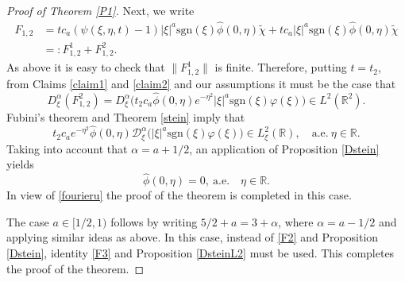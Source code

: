 \documentclass[reqno]{amsart}
\newcommand{\ha}{\hat{\phi}}
\newcommand{\R}{\mathbb R}
\newcommand{\sgn}{\text{sgn}}
\numberwithin{equation}{section}
\begin{document}
\begin{proof}[Proof of Theorem \ref{P1}]
Next, we write
\begin{equation}\label{desB5}
\begin{split}
F_{1,2}
&= tc_a (\psi(\xi,\eta,t) -1) |\xi|^{a}\sgn(\xi)\ha(0,\eta) \tilde{\chi}+tc_a|\xi|^a \sgn(\xi)\ha(0,\eta)\tilde{\chi}\\
&=: F_{1,2}^{1}+F_{1,2}^{2}.
\end{split}
\end{equation}
As above it is easy to check that  $\|F_{1,2}^{1}\|$ is finite. Therefore, putting $t=t_2$, from Claims \ref{claim1} and \ref{claim2} and our assumptions it must be the case that 
\begin{equation*}
 D^{\alpha}_{\xi}(F_{1,2}^{2})=D^{\alpha}_{\xi}\big( t_2 c_a \ha (0,\eta)e^{-\eta^2}|\xi|^a \sgn(\xi)\varphi(\xi)\big) \in L^2(\R^2).
\end{equation*}
Fubini's theorem and Theorem \ref{stein} imply that
\begin{equation}\label{teoP1e}
t_2 c_a e^{-\eta^2}\ha (0,\eta)\mathcal{D}^{\alpha}_{\xi}\big(|\xi|^a \sgn(\xi)\varphi (\xi)\big)\in L^{2}_{\xi}(\R),\quad \mathrm{a.e.} \ \eta \in \R.
\end{equation}
Taking into account that $\alpha=a+1/2$, an application of Proposition \ref{Dstein} yields
$$
\hat{\phi}(0,\eta)=0, \ \mathrm{a.e.} \quad  \eta \in \R.
$$
In view of \eqref{fourieru} the proof of the theorem is completed in this case.

The case $a\in [1/2,1)$ follows by writing $5/2+a=3+\alpha$, where $\alpha=a-1/2$ and applying similar ideas as above. In this case, instead of \eqref{F2} and Proposition \ref{Dstein}, identity \eqref{F3} and Proposition \ref{DsteinL2} must be used. This completes the proof of the theorem.
\end{proof}
\end{document}
